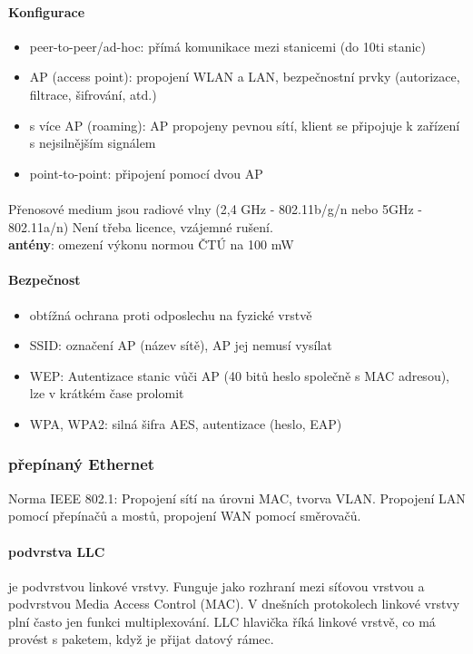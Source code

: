 \documentclass[10pt,a4paper]{article}
\begin{document}
\paragraph{Konfigurace}
\begin{itemize}
	\item peer-to-peer/ad-hoc: přímá komunikace mezi stanicemi (do 10ti stanic)
	\item AP (access point): propojení WLAN a LAN, bezpečnostní prvky (autorizace, filtrace, šifrování, atd.)
	\item s více AP (roaming): AP propojeny pevnou sítí, klient se připojuje k zařízení s nejsilnějším signálem
	\item point-to-point: připojení pomocí dvou AP
\end{itemize}
\paragraph{}Přenosové medium jsou radiové vlny (2,4 GHz - 802.11b/g/n nebo 5GHz - 802.11a/n) Není třeba licence, vzájemné rušení. \\
\textbf{antény}: omezení výkonu normou ČTÚ na 100 mW \\
\paragraph{Bezpečnost}
\begin{itemize}
	\item obtížná ochrana proti odposlechu na fyzické vrstvě
	\item SSID: označení AP (název sítě), AP jej nemusí vysílat
	\item WEP: Autentizace stanic vůči AP (40 bitů heslo společně s MAC adresou), lze v krátkém čase prolomit
	\item WPA, WPA2: silná šifra AES, autentizace (heslo, EAP)
\end{itemize}
\subsubsection{přepínaný Ethernet}
Norma IEEE 802.1: Propojení sítí na úrovni MAC, tvorva VLAN. Propojení LAN pomocí přepínačů a mostů, propojení WAN pomocí směrovačů.
\paragraph{podvrstva LLC} je podvrstvou linkové vrstvy. Funguje jako rozhraní mezi síťovou vrstvou a podvrstvou Media Access Control (MAC). V dnešních protokolech linkové vrstvy plní často jen funkci multiplexování. LLC hlavička říká linkové vrstvě, co má provést s paketem, když je přijat datový rámec.
\end{document}
